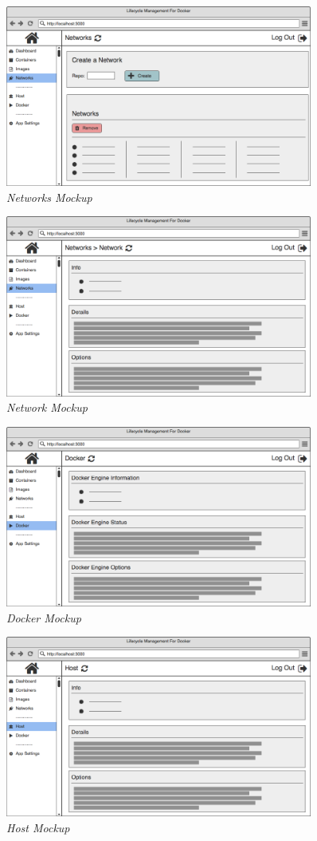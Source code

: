 \begin{figure}[!ht]
\centering
\includegraphics*[width=0.9\textwidth]{wireframes/networks}
\caption{\em Networks Mockup}
\end{figure}

\begin{figure}[!ht]
\centering
\includegraphics*[width=0.9\textwidth]{wireframes/network}
\caption{\em Network Mockup}
\end{figure}

\begin{figure}[!ht]
\centering
\includegraphics*[width=0.9\textwidth]{wireframes/docker}
\caption{\em Docker Mockup}
\end{figure}

\begin{figure}[!ht]
\centering
\includegraphics*[width=0.9\textwidth]{wireframes/host}
\caption{\em Host Mockup}
\end{figure}
